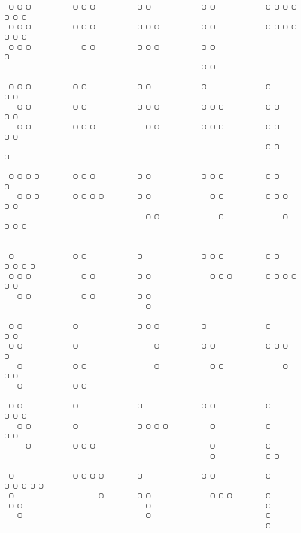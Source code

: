 {
\footnotesize
\begin{Verbatim}
 ▢ ▢ ▢          ▢ ▢ ▢          ▢ ▢            ▢ ▢            ▢ ▢ ▢ ▢        ▢ ▢ ▢
 ▢ ▢ ▢          ▢ ▢ ▢          ▢ ▢ ▢          ▢ ▢            ▢ ▢ ▢ ▢        ▢ ▢ ▢
 ▢ ▢ ▢            ▢ ▢          ▢ ▢ ▢          ▢ ▢                               ▢
                                              ▢ ▢                          
                                                                           
 ▢ ▢ ▢          ▢ ▢            ▢ ▢            ▢              ▢              ▢ ▢
   ▢ ▢          ▢ ▢            ▢ ▢ ▢          ▢ ▢ ▢          ▢ ▢            ▢ ▢
   ▢ ▢          ▢ ▢ ▢            ▢ ▢          ▢ ▢ ▢          ▢ ▢            ▢ ▢
                                                             ▢ ▢              ▢
                                                                           
 ▢ ▢ ▢ ▢        ▢ ▢ ▢          ▢ ▢            ▢ ▢ ▢          ▢ ▢            ▢
   ▢ ▢ ▢        ▢ ▢ ▢ ▢        ▢ ▢              ▢ ▢          ▢ ▢ ▢          ▢ ▢
                                 ▢ ▢              ▢              ▢          ▢ ▢ ▢
                                                                           
                                                                           
 ▢              ▢ ▢            ▢              ▢ ▢ ▢          ▢ ▢            ▢ ▢ ▢ ▢
 ▢ ▢ ▢            ▢ ▢          ▢ ▢              ▢ ▢ ▢        ▢ ▢ ▢ ▢            ▢ ▢
   ▢ ▢            ▢ ▢          ▢ ▢                                         
                                 ▢                                         
                                                                           
 ▢ ▢            ▢              ▢ ▢ ▢          ▢              ▢              ▢ ▢
 ▢ ▢            ▢                  ▢          ▢ ▢            ▢ ▢ ▢            ▢
   ▢            ▢ ▢                ▢            ▢ ▢              ▢            ▢ ▢
   ▢            ▢ ▢                                                        
                                                                           
 ▢ ▢            ▢              ▢              ▢ ▢            ▢              ▢ ▢ ▢
   ▢ ▢          ▢              ▢ ▢ ▢ ▢          ▢            ▢                  ▢ ▢
     ▢          ▢ ▢ ▢                           ▢            ▢             
                                                ▢            ▢ ▢           
                                                                           
 ▢              ▢ ▢ ▢ ▢        ▢              ▢ ▢            ▢              ▢ ▢ ▢ ▢ ▢
 ▢                    ▢        ▢ ▢              ▢ ▢ ▢        ▢             
 ▢ ▢                             ▢                           ▢             
   ▢                             ▢                           ▢             
                                                             ▢             

\end{Verbatim}
}
